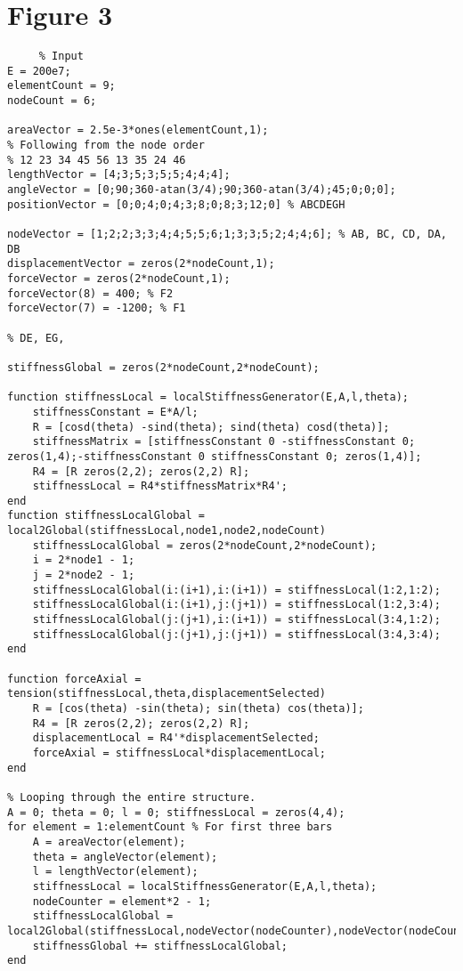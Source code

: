 \documentclass{article}
\begin{document}
\section{Figure 3} %
\begin{verbatim}
     % Input
E = 200e7;
elementCount = 9;
nodeCount = 6;

areaVector = 2.5e-3*ones(elementCount,1);
% Following from the node order
% 12 23 34 45 56 13 35 24 46
lengthVector = [4;3;5;3;5;5;4;4;4];
angleVector = [0;90;360-atan(3/4);90;360-atan(3/4);45;0;0;0];
positionVector = [0;0;4;0;4;3;8;0;8;3;12;0] % ABCDEGH

nodeVector = [1;2;2;3;3;4;4;5;5;6;1;3;3;5;2;4;4;6]; % AB, BC, CD, DA, DB
displacementVector = zeros(2*nodeCount,1);
forceVector = zeros(2*nodeCount,1);
forceVector(8) = 400; % F2
forceVector(7) = -1200; % F1

% DE, EG,

stiffnessGlobal = zeros(2*nodeCount,2*nodeCount);

function stiffnessLocal = localStiffnessGenerator(E,A,l,theta);
    stiffnessConstant = E*A/l;
    R = [cosd(theta) -sind(theta); sind(theta) cosd(theta)];
    stiffnessMatrix = [stiffnessConstant 0 -stiffnessConstant 0; zeros(1,4);-stiffnessConstant 0 stiffnessConstant 0; zeros(1,4)];
    R4 = [R zeros(2,2); zeros(2,2) R];
    stiffnessLocal = R4*stiffnessMatrix*R4';
end
function stiffnessLocalGlobal = local2Global(stiffnessLocal,node1,node2,nodeCount)
    stiffnessLocalGlobal = zeros(2*nodeCount,2*nodeCount);
    i = 2*node1 - 1;
    j = 2*node2 - 1;
    stiffnessLocalGlobal(i:(i+1),i:(i+1)) = stiffnessLocal(1:2,1:2);
    stiffnessLocalGlobal(i:(i+1),j:(j+1)) = stiffnessLocal(1:2,3:4);
    stiffnessLocalGlobal(j:(j+1),i:(i+1)) = stiffnessLocal(3:4,1:2);
    stiffnessLocalGlobal(j:(j+1),j:(j+1)) = stiffnessLocal(3:4,3:4);
end

function forceAxial = tension(stiffnessLocal,theta,displacementSelected)
    R = [cos(theta) -sin(theta); sin(theta) cos(theta)];
    R4 = [R zeros(2,2); zeros(2,2) R];
    displacementLocal = R4'*displacementSelected;
    forceAxial = stiffnessLocal*displacementLocal;
end

% Looping through the entire structure.
A = 0; theta = 0; l = 0; stiffnessLocal = zeros(4,4);
for element = 1:elementCount % For first three bars
    A = areaVector(element);
    theta = angleVector(element);
    l = lengthVector(element);
    stiffnessLocal = localStiffnessGenerator(E,A,l,theta);
    nodeCounter = element*2 - 1;
    stiffnessLocalGlobal = local2Global(stiffnessLocal,nodeVector(nodeCounter),nodeVector(nodeCounter+1),nodeCount);
    stiffnessGlobal += stiffnessLocalGlobal;
end


\end{verbatim}
\end{document}
